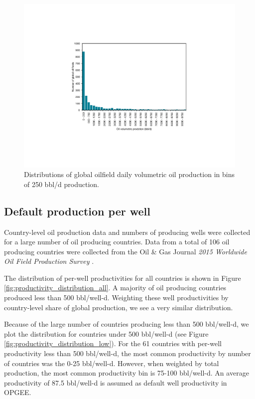 \documentclass[11pt]{report}
\begin{document}
\begin{figure}[t]
\includegraphics[width=0.8\columnwidth]{images/production_distribution.pdf}
\caption{Distributions of global oilfield daily volumetric oil production in bins of 250 bbl/d production.}
\label{fig:production_distribution}
\end{figure}

\subsection{Default production per well} \label{sec:well_production}

Country-level oil production data and numbers of producing wells were collected for a large number of oil producing countries. Data from a total of 106 oil producing countries were collected from the Oil \& Gas Journal \emph{2015 Worldwide Oil Field Production Survey} \cite{OGJ2015}. 

The distribution of per-well productivities for all countries is shown in Figure \ref{fig:productivity_distribution_all}. A majority of oil producing countries produced less than 500 bbl/well-d. Weighting these well productivities by country-level share of global production, we see a very similar distribution.

Because of the large number of countries producing less than 500 bbl/well-d, we plot the distribution for countries under 500 bbl/well-d (see Figure \ref{fig:productivity_distribution_low}). For the 61 countries with per-well productivity less than 500 bbl/well-d, the most common productivity by number of countries was the 0-25 bbl/well-d. However, when weighted by total production, the most common productivity bin is 75-100 bbl/well-d. An average productivity of 87.5 bbl/well-d is assumed as default well productivity in OPGEE. 
\end{document}
